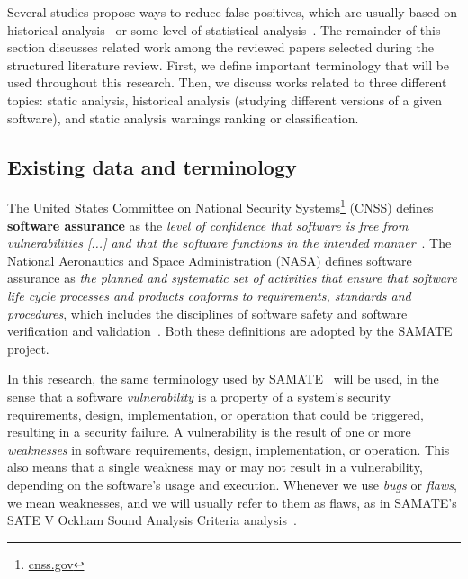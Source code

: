 Several studies propose ways to reduce false positives, which are usually based
on historical analysis~\cite{penta_evolution_2008, spacco_tracking_2006,
kim_which_2007} or some level of statistical analysis~\cite{muske2013review,
boogerd2006prioritizing, kremenek2003z, ruthruff_predicting_2008}. The
remainder of this section discusses related work among the reviewed papers
selected during the structured literature review. First, we define important terminology
that will be used throughout this research. Then, we discuss works related to
three different topics: static analysis, historical analysis (studying
different versions of a given software), and static analysis warnings ranking
or classification.

\subsection{Existing data and terminology}
\label{sub:terminology}

The United States Committee on National Security
Systems\footnote{\url{cnss.gov}} (CNSS) defines \textbf{software assurance} as
the \textit{level of confidence that software is free from vulnerabilities [...]
and that the software functions in the intended
manner}~\cite{instruction20034009}. The National Aeronautics and Space
Administration (NASA) defines software assurance as \textit{the planned and
systematic set of activities that ensure that software life cycle processes and
products conforms to requirements, standards and procedures}, which includes
the disciplines of software safety and software verification and
validation~\cite{nasastd8739}. Both these definitions are adopted by the SAMATE
project.

In this research, the same terminology used by
SAMATE~\cite{black_counting_2011} will be used, in the sense that a software
\textit{vulnerability} is a property of a system's security requirements,
design, implementation, or operation that could be triggered, resulting in a
security failure. A vulnerability is the result of one or more
\textit{weaknesses} in software requirements, design, implementation, or
operation. This also means that a single weakness may or may not result in a
vulnerability, depending on the software's usage and execution. Whenever we use
\textit{bugs} or \textit{flaws}, we mean weaknesses, and we will usually refer
to them as flaws, as in SAMATE's SATE V Ockham Sound Analysis Criteria
analysis~\cite{black_sate_2016}.

